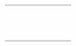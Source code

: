 \documentclass[../alan-handbook.tex]{subfiles}
\begin{document}
\begin{longtable}[c]{|l|l|l|l|l|l|l|}
                        &                       &                               &                   &                      &                           &                            \\ \hline
                        &                       &                               &                   &                      &                           &                            \\ \hline
                        &                       &                               &                   &                      &                           &                            \\ \hline
                        &                       &                               &                   &                      &                           &                            \\ \hline
                        &                       &                               &                   &                      &                           &                            \\ \hline
                        &                       &                               &                   &                      &                           &                            \\ \hline
                        &                       &                               &                   &                      &                           &                            \\ \hline
                        &                       &                               &                   &                      &                           &                            \\ \hline
                        &                       &                               &                   &                      &                           &                            \\ \hline
                        &                       &                               &                   &                      &                           &                            \\ \hline
                        &                       &                               &                   &                      &                           &                            \\ \hline
\end{longtable}
\end{document}
